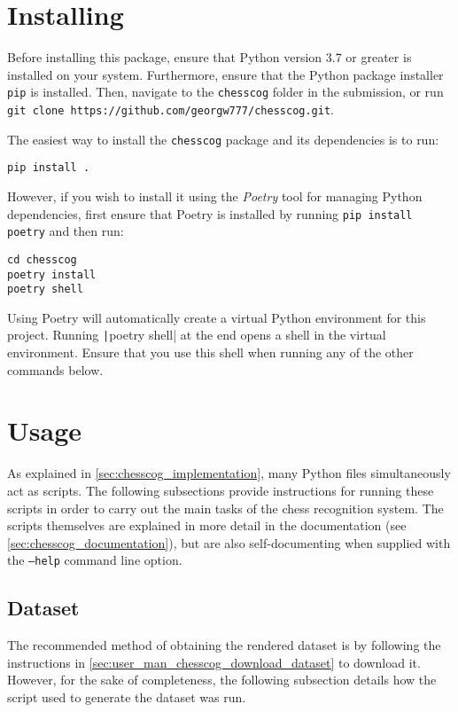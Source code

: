 \documentclass[../../report.tex]{subfiles}
\begin{document}
\section{Installing}
Before installing this package, ensure that Python version 3.7 or greater is installed on your system.
Furthermore, ensure that the Python package installer \texttt{pip} is installed.
Then, navigate to the \texttt{chesscog} folder in the submission, or run \texttt{git clone https://github.com/georgw777/chesscog.git}.

The easiest way to install the \texttt{chesscog} package and its dependencies is to run:
\begin{verbatim}
pip install .
\end{verbatim}

However, if you wish to install it using the \emph{Poetry} tool for managing Python dependencies, first ensure that Poetry is installed by running \texttt{pip install poetry} and then run:
\begin{verbatim}
cd chesscog
poetry install
poetry shell
\end{verbatim}
Using Poetry will automatically create a virtual Python environment for this project.
Running \texttt|poetry shell| at the end opens a shell in the virtual environment. 
Ensure that you use this shell when running any of the other commands below.

\section{Usage}

As explained in \cref{sec:chesscog_implementation}, many Python files simultaneously act as scripts.
The following subsections provide instructions for running these scripts in order to carry out the main tasks of the chess recognition system.
The scripts themselves are explained in more detail in the documentation (see \cref{sec:chesscog_documentation}), but are also self-documenting when supplied with the \texttt{--help} command line option.

\subsection{Dataset}
\label{sec:user_man_chesscog_dataset}

The recommended method of obtaining the rendered dataset is by following the instructions in \cref{sec:user_man_chesscog_download_dataset} to download it.
However, for the sake of completeness, the following subsection details how the script used to generate the dataset was run.
\end{document}
